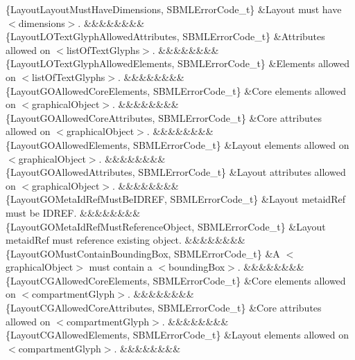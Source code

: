 \begin{DoxyParagraph}{}
\begin{longtabu}
\{Layout\+Layout\+Must\+Have\+Dimensions, S\+B\+M\+L\+Error\+Code\+\_\+t\} &Layout must have {\ttfamily $<$dimensions$>$}. &&&&&&&&\\
\{Layout\+L\+O\+Text\+Glyph\+Allowed\+Attributes, S\+B\+M\+L\+Error\+Code\+\_\+t\} &Attributes allowed on {\ttfamily $<$list\+Of\+Text\+Glyphs$>$}. &&&&&&&&\\
\{Layout\+L\+O\+Text\+Glyph\+Allowed\+Elements, S\+B\+M\+L\+Error\+Code\+\_\+t\} &Elements allowed on {\ttfamily $<$list\+Of\+Text\+Glyphs$>$}. &&&&&&&&\\
\{Layout\+G\+O\+Allowed\+Core\+Elements, S\+B\+M\+L\+Error\+Code\+\_\+t\} &Core elements allowed on {\ttfamily $<$graphical\+Object$>$}. &&&&&&&&\\
\{Layout\+G\+O\+Allowed\+Core\+Attributes, S\+B\+M\+L\+Error\+Code\+\_\+t\} &Core attributes allowed on {\ttfamily $<$graphical\+Object$>$}. &&&&&&&&\\
\{Layout\+G\+O\+Allowed\+Elements, S\+B\+M\+L\+Error\+Code\+\_\+t\} &Layout elements allowed on {\ttfamily $<$graphical\+Object$>$}. &&&&&&&&\\
\{Layout\+G\+O\+Allowed\+Attributes, S\+B\+M\+L\+Error\+Code\+\_\+t\} &Layout attributes allowed on {\ttfamily $<$graphical\+Object$>$}. &&&&&&&&\\
\{Layout\+G\+O\+Meta\+Id\+Ref\+Must\+Be\+I\+D\+R\+EF, S\+B\+M\+L\+Error\+Code\+\_\+t\} &Layout \textquotesingle{}metaid\+Ref\textquotesingle{} must be I\+D\+R\+EF. &&&&&&&&\\
\{Layout\+G\+O\+Meta\+Id\+Ref\+Must\+Reference\+Object, S\+B\+M\+L\+Error\+Code\+\_\+t\} &Layout \textquotesingle{}metaid\+Ref\textquotesingle{} must reference existing object. &&&&&&&&\\
\{Layout\+G\+O\+Must\+Contain\+Bounding\+Box, S\+B\+M\+L\+Error\+Code\+\_\+t\} &A {\ttfamily $<$graphical\+Object$>$} must contain a {\ttfamily $<$bounding\+Box$>$}. &&&&&&&&\\
\{Layout\+C\+G\+Allowed\+Core\+Elements, S\+B\+M\+L\+Error\+Code\+\_\+t\} &Core elements allowed on {\ttfamily $<$compartment\+Glyph$>$}. &&&&&&&&\\
\{Layout\+C\+G\+Allowed\+Core\+Attributes, S\+B\+M\+L\+Error\+Code\+\_\+t\} &Core attributes allowed on {\ttfamily $<$compartment\+Glyph$>$}. &&&&&&&&\\
\{Layout\+C\+G\+Allowed\+Elements, S\+B\+M\+L\+Error\+Code\+\_\+t\} &Layout elements allowed on {\ttfamily $<$compartment\+Glyph$>$}. &&&&&&&&\\

\end{longtabu}
\end{DoxyParagraph}
